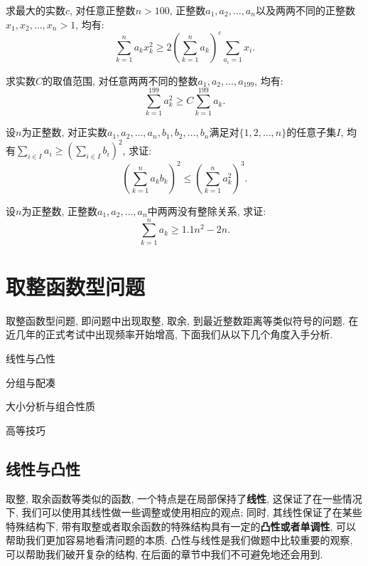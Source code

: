 \documentclass[lang=cn,12pt,thmcnt=section]{elegantbook}
\begin{document}
\begin{exercise}
求最大的实数$c$, 对任意正整数$n>100$, 正整数$a_1,a_2,\dots{},a_n$以及两两不同的正整数$x_1,x_2,\dots{},x_n>1$, 均有:
\[
\sum_{k=1}^n a_kx_k^2\ge 2\left(\sum_{k=1}^n a_k\right)^c\sum_{a_i=1}x_i.
\]
\end{exercise}

\begin{exercise}
求实数$C$的取值范围, 对任意两两不同的整数$a_1,a_2,\dots{},a_{199}$, 均有: 
\[
\sum_{k=1}^{199}a_k^2\ge C\sum_{k=1}^{199}a_k.
\]
\end{exercise}

\begin{exercise}
设$n$为正整数, 对正实数$a_1,a_2,\dots{},a_n,b_1,b_2,\dots{},b_n$满足对$\{1,2,\dots{},n\}$的任意子集$I$, 均有$\sum\limits_{i\in I}a_i\ge \left(\sum\limits_{i\in I}b_i\right)^2$, 求证: 
\[
\left(\sum_{k=1}^n a_kb_k\right)^2\le \left(\sum_{k=1}^n a_k^2\right)^3.
\]
\end{exercise}

\begin{exercise}
设$n$为正整数, 正整数$a_1,a_2,\dots{},a_n$中两两没有整除关系, 求证: 
\[
\sum_{k=1}^n a_k\ge 1.1n^2-2n.
\]
\end{exercise}

\chapter{取整函数型问题}

取整函数型问题, 即问题中出现取整, 取余, 到最近整数距离等类似符号的问题. 在近几年的正式考试中出现频率开始增高, 下面我们从以下几个角度入手分析.

\begin{introduction}
\item 线性与凸性
\item 分组与配凑
\item 大小分析与组合性质
\item 高等技巧
\end{introduction}

\section{线性与凸性}

取整, 取余函数等类似的函数, 一个特点是在局部保持了\textbf{线性}, 这保证了在一些情况下, 我们可以使用其线性做一些调整或使用相应的观点; 同时, 其线性保证了在某些特殊结构下, 带有取整或者取余函数的特殊结构具有一定的\textbf{凸性或者单调性}, 可以帮助我们更加容易地看清问题的本质. 凸性与线性是我们做题中比较重要的观察, 可以帮助我们破开复杂的结构, 在后面的章节中我们不可避免地还会用到. 
\end{document}
